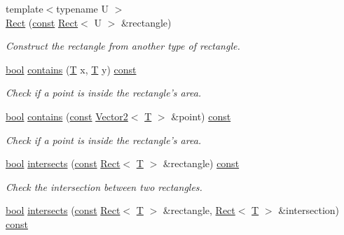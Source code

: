 \begin{DoxyCompactItemize}
{\footnotesize template$<$typename U $>$ }\\\hyperlink{classsf_1_1_rect_a6fff2bb7e93677839461a66bc2957de0}{Rect} (\hyperlink{term__entry_8h_a57bd63ce7f9a353488880e3de6692d5a}{const} \hyperlink{classsf_1_1_rect}{Rect}$<$ U $>$ \&rectangle)
\begin{DoxyCompactList}\small\item\em Construct the rectangle from another type of rectangle. \end{DoxyCompactList}\item 
\hyperlink{term__entry_8h_a002004ba5d663f149f6c38064926abac}{bool} \hyperlink{classsf_1_1_rect_aa8a5364c84de6dd5299f833b54e31ef1}{contains} (\hyperlink{curses_8priv_8h_a5ef253115820acf7d27f3c5c3b02a0f0}{T} x, \hyperlink{curses_8priv_8h_a5ef253115820acf7d27f3c5c3b02a0f0}{T} y) \hyperlink{term__entry_8h_a57bd63ce7f9a353488880e3de6692d5a}{const} 
\begin{DoxyCompactList}\small\item\em Check if a point is inside the rectangle's area. \end{DoxyCompactList}\item 
\hyperlink{term__entry_8h_a002004ba5d663f149f6c38064926abac}{bool} \hyperlink{classsf_1_1_rect_a24163acdb9b2987c0ea55c201e270d41}{contains} (\hyperlink{term__entry_8h_a57bd63ce7f9a353488880e3de6692d5a}{const} \hyperlink{classsf_1_1_vector2}{Vector2}$<$ \hyperlink{curses_8priv_8h_a5ef253115820acf7d27f3c5c3b02a0f0}{T} $>$ \&point) \hyperlink{term__entry_8h_a57bd63ce7f9a353488880e3de6692d5a}{const} 
\begin{DoxyCompactList}\small\item\em Check if a point is inside the rectangle's area. \end{DoxyCompactList}\item 
\hyperlink{term__entry_8h_a002004ba5d663f149f6c38064926abac}{bool} \hyperlink{classsf_1_1_rect_a566740c8f58e01bb052266f47e7e1011}{intersects} (\hyperlink{term__entry_8h_a57bd63ce7f9a353488880e3de6692d5a}{const} \hyperlink{classsf_1_1_rect}{Rect}$<$ \hyperlink{curses_8priv_8h_a5ef253115820acf7d27f3c5c3b02a0f0}{T} $>$ \&rectangle) \hyperlink{term__entry_8h_a57bd63ce7f9a353488880e3de6692d5a}{const} 
\begin{DoxyCompactList}\small\item\em Check the intersection between two rectangles. \end{DoxyCompactList}\item 
\hyperlink{term__entry_8h_a002004ba5d663f149f6c38064926abac}{bool} \hyperlink{classsf_1_1_rect_a5f1874792b04c7e221bb786b31f5836e}{intersects} (\hyperlink{term__entry_8h_a57bd63ce7f9a353488880e3de6692d5a}{const} \hyperlink{classsf_1_1_rect}{Rect}$<$ \hyperlink{curses_8priv_8h_a5ef253115820acf7d27f3c5c3b02a0f0}{T} $>$ \&rectangle, \hyperlink{classsf_1_1_rect}{Rect}$<$ \hyperlink{curses_8priv_8h_a5ef253115820acf7d27f3c5c3b02a0f0}{T} $>$ \&intersection) \hyperlink{term__entry_8h_a57bd63ce7f9a353488880e3de6692d5a}{const} 

\end{DoxyCompactItemize}
